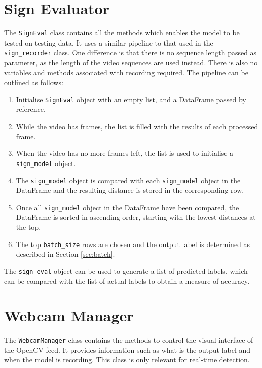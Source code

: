 \documentclass[final,rdr32.tex]{subfiles}
\begin{document}
\section{Sign Evaluator}
\label{sec:sign_eval}

The \verb|SignEval| class contains all the methods which enables the model to be tested on testing data. It uses a similar pipeline to that used in the \verb|sign_recorder| class. One difference is that there is no sequence length passed as parameter, as the length of the video sequences are used instead. There is also no variables and methods associated with recording required. The pipeline can be outlined as follows:

\begin{enumerate}
    \item Initialise \verb|SignEval| object with an empty list, and a DataFrame passed by reference.
    \item While the video has frames, the list is filled with the results of each processed frame.
    \item When the video has no more frames left, the list is used to initialise a  \verb|sign_model| object.
    \item The \verb|sign_model| object is compared with each \verb|sign_model| object in the DataFrame and the resulting distance is stored in the corresponding row.
    \item Once all \verb|sign_model| object in the DataFrame have been compared, the DataFrame is sorted in ascending order, starting with the lowest distances at the top.
    \item The top \verb|batch_size| rows are chosen and the output label is determined as described in Section \ref{sec:batch}.
\end{enumerate}

The \verb|sign_eval| object can be used to generate a list of predicted labels, which can be compared with the list of actual labels to obtain a measure of accuracy.


\section{Webcam Manager}
\label{sec:webcam}

The \verb|WebcamManager| class contains the methods to control the visual interface of the OpenCV feed. It provides information such as what is the output label and when the model is recording. This class is only relevant for real-time detection.
\end{document}
